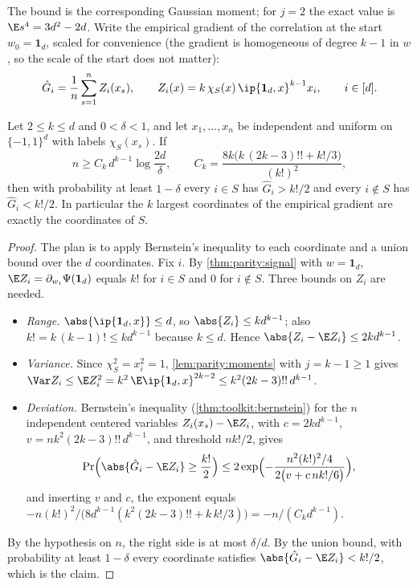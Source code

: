 \begin{refsection}
The bound is the corresponding Gaussian moment; for $j=2$ the exact value is $\E s^4=3d^2-2d$. Write the empirical gradient of the correlation at the start $w_0=\mathbf 1_d$, scaled for convenience (the gradient is homogeneous of degree $k-1$ in $w$, so the scale of the start does not matter):
\begin{equation}\label{eq:parity:Ghat}
  \hat G_i=\frac1n\sum_{s=1}^nZ_i(x_s),\qquad Z_i(x)=k\,\chi_S(x)\,\ip{\mathbf 1_d,x}^{k-1}x_i,\qquad i\in[d].
\end{equation}

\begin{theorem}\label{thm:parity:onestep}
Let $2\le k\le d$ and $0<\delta<1$, and let $x_1,\dots,x_n$ be independent and uniform on $\{-1,1\}^d$ with labels $\chi_S(x_s)$. If
\[
  n\ge C_k\,d^{k-1}\log\frac{2d}\delta,\qquad C_k=\frac{8k\bigl(k\,(2k-3)!!+k!/3\bigr)}{(k!)^2},
\]
then with probability at least $1-\delta$ every $i\in S$ has $\hat G_i>k!/2$ and every $i\notin S$ has $\hat G_i<k!/2$. In particular the $k$ largest coordinates of the empirical gradient are exactly the coordinates of $S$.
\end{theorem}

\begin{proof}
The plan is to apply Bernstein's inequality to each coordinate and a union bound over the $d$ coordinates. Fix $i$. By \cref{thm:parity:signal} with $w=\mathbf 1_d$, $\E Z_i=\partial_{w_i}\Psi(\mathbf 1_d)$ equals $k!$ for $i\in S$ and $0$ for $i\notin S$. Three bounds on $Z_i$ are needed.
\begin{itemize}
\item \emph{Range.} $\abs{\ip{\mathbf 1_d,x}}\le d$, so $\abs{Z_i}\le kd^{k-1}$; also $k!=k\,(k-1)!\le kd^{k-1}$ because $k\le d$. Hence $\abs{Z_i-\E Z_i}\le2kd^{k-1}$.
\item \emph{Variance.} Since $\chi_S^2=x_i^2=1$, \cref{lem:parity:moments} with $j=k-1\ge1$ gives $\Var Z_i\le\E Z_i^2=k^2\,\E\ip{\mathbf 1_d,x}^{2k-2}\le k^2(2k-3)!!\,d^{k-1}$.
\item \emph{Deviation.} Bernstein's inequality (\cref{thm:toolkit:bernstein}) for the $n$ independent centered variables $Z_i(x_s)-\E Z_i$, with $c=2kd^{k-1}$, $v=nk^2(2k-3)!!\,d^{k-1}$, and threshold $nk!/2$, gives
\[
  \Pr\Bigl(\abs{\hat G_i-\E Z_i}\ge\frac{k!}2\Bigr)\le2\exp\Bigl(-\frac{n^2(k!)^2/4}{2\bigl(v+c\,nk!/6\bigr)}\Bigr),
\]
and inserting $v$ and $c$, the exponent equals $-n(k!)^2/\bigl(8d^{k-1}(k^2(2k-3)!!+k\,k!/3)\bigr)=-n/(C_kd^{k-1})$.
\end{itemize}
By the hypothesis on $n$, the right side is at most $\delta/d$. By the union bound, with probability at least $1-\delta$ every coordinate satisfies $\abs{\hat G_i-\E Z_i}<k!/2$, which is the claim.
\end{proof}


\end{refsection}
